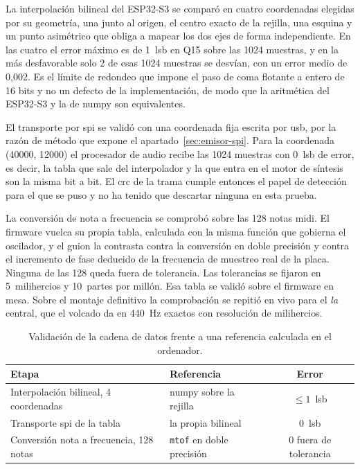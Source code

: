 La interpolación bilineal del ESP32-S3 se comparó en cuatro coordenadas
elegidas por su geometría, una junto al origen, el centro exacto de la
rejilla, una esquina y un punto asimétrico que obliga a mapear los dos ejes de
forma independiente. En las cuatro el error máximo es de 1~\gls{lsb} en Q15
sobre las 1024 muestras, y en la más desfavorable solo 2 de esas 1024 muestras
se desvían, con un error medio de 0,002. Es el límite de redondeo que impone
el paso de coma flotante a entero de 16 bits y no un defecto de la
implementación, de modo que la aritmética del ESP32-S3 y la de numpy son
equivalentes.

El transporte por \gls{spi} se validó con una coordenada fija escrita por
\gls{usb}, por la razón de método que expone el apartado~\ref{sec:emisor-spi}.
Para la coordenada (40000, 12000) el procesador de audio recibe las 1024
muestras con 0~\gls{lsb} de error, es decir, la tabla que sale del interpolador
y la que entra en el motor de síntesis son la misma bit a bit. El \gls{crc} de
la trama cumple entonces el papel de detección para el que se puso y no ha
tenido que descartar ninguna en esta prueba.

La conversión de nota a frecuencia se comprobó sobre las 128 notas \gls{midi}.
El firmware vuelca su propia tabla, calculada con la misma función que gobierna
el oscilador, y el guion la contrasta contra la conversión en doble precisión y
contra el incremento de fase deducido de la frecuencia de muestreo real de la
placa. Ninguna de las 128 queda fuera de tolerancia. Las tolerancias se
fijaron en 5~milihercios y 10~partes por millón. Esa tabla se validó
sobre el firmware en mesa. Sobre el montaje definitivo la comprobación se
repitió en vivo para el \emph{la} central, que el volcado da en 440~Hz exactos
con resolución de milihercios.

\begin{table}[htbp]
    \centering
    \caption{Validación de la cadena de datos frente a una referencia
             calculada en el ordenador.}
    \label{tab:validacion}
    \begin{tabular}{llc}
        \toprule
        \textbf{Etapa} & \textbf{Referencia} & \textbf{Error} \\
        \midrule
        Interpolación bilineal, 4 coordenadas   & numpy sobre la rejilla           & $\leq 1$~\gls{lsb} \\
        Transporte \gls{spi} de la tabla        & la propia bilineal               & 0~\gls{lsb} \\
        Conversión nota a frecuencia, 128 notas & \texttt{mtof} en doble precisión & 0 fuera de tolerancia \\
        \bottomrule
    \end{tabular}
\end{table}

